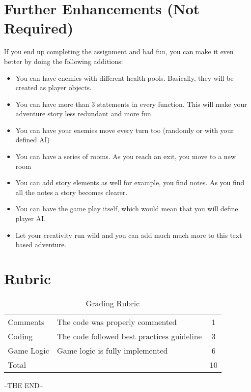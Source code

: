 \documentclass[a4paper,12pt]{article}
\begin{document}
\section{Further Enhancements (Not Required)}
If you end up completing the assignment and had fun, you can make it even better by doing the following additions:
\begin{itemize}
	\item You can have enemies with different health pools. Basically, they will be created as player objects.
	\item You can have more than 3 statements in every function. This will make your adventure story less redundant and more fun.
	\item You can have your enemies move every turn too (randomly or with your defined AI)
	\item You can have a series of rooms. As you reach an exit, you move to a new room
	\item You can add story elements as well for example, you find notes. As you find all the notes a story becomes clearer.
	\item You can have the game play itself, which would mean that you will define player AI.
	\item Let your creativity run wild and you can add much much more to this text based adventure.
\end{itemize}

\section{Rubric}
\begin{table}[h]
	\centering
	\begin{tabular}{llc}
		\toprule
		Comments   & The code was properly commented            & 1  \\
		Coding     & The code followed best practices guideline & 3  \\
		Game Logic & Game logic is fully implemented            & 6  \\
		\midrule
		Total      &                                            & 10 \\
		\bottomrule
	\end{tabular}
	\caption{Grading Rubric}
	\label{Grading}
\end{table}

\begin{center}
	--THE END--
\end{center}
\end{document}
